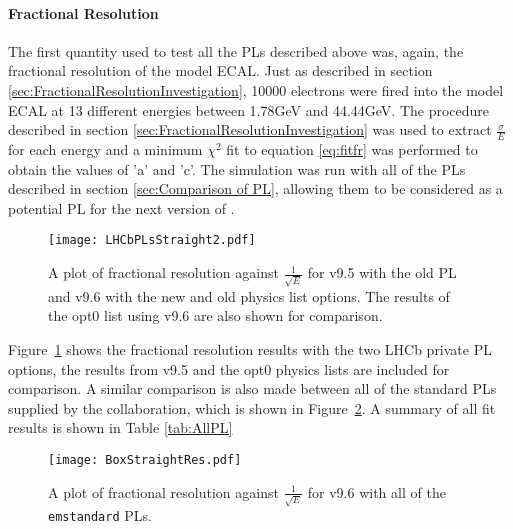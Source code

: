 \paragraph{Fractional Resolution}
The first quantity used to test all the PLs described above was, again, the fractional resolution of the model ECAL.  Just as described in section \ref{sec:FractionalResolutionInvestigation}, 10000 electrons were fired into the model ECAL at 13 different energies between 1.78GeV and 44.44GeV.  The procedure described in section \ref{sec:FractionalResolutionInvestigation} was used to extract $\frac{\sigma}{E}$ for each energy and a minimum $\chi^2$ fit to equation \ref{eq:fitfr} was performed to obtain the values of 'a' and 'c'.  The simulation was run with all of the PLs described in section \ref{sec:Comparison of PL}, allowing them to be considered as a potential PL for the next version of \gauss.
\begin{figure}[h]
  \centering
  \texttt{[image: LHCbPLsStraight2.pdf]}
  \caption{A plot of fractional resolution against $\frac{1}{\sqrt{E}}$ for \geant v9.5 with the old PL and v9.6 with the new and old physics list options.  The results of the opt0 list using v9.6 are also shown for comparison.}
  \label{fig:LHCbPLStraightFR}
\end{figure}

Figure~\ref{fig:LHCbPLStraightFR} shows the fractional resolution results with the two LHCb private PL options, the results from v9.5 and the opt0 physics lists are included for comparison. A similar comparison is also made between all of the standard PLs supplied by the \geant collaboration, which is shown in Figure~\ref{fig:BoxPLStraightFR}.  A summary of all fit results is shown in Table \ref{tab:AllPL}
\begin{figure}[h]
  \centering
  \texttt{[image: BoxStraightRes.pdf]}
  \caption{A plot of fractional resolution against $\frac{1}{\sqrt{E}}$ for \geant v9.6 with all of the \texttt{emstandard} PLs.}
  \label{fig:BoxPLStraightFR}
\end{figure}

